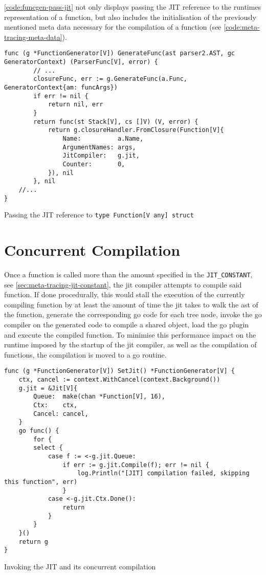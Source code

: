 \autoref{code:funcgen-pass-jit} not only displays passing the JIT reference
to the runtimes representation of a function, but also includes the
initialisation of the previously mentioned meta data necessary for the
compilation of a function (see \autoref{code:meta-tracing-meta-data}).

\begin{listing}[H]
    \begin{verbatim}
func (g *FunctionGenerator[V]) GenerateFunc(ast parser2.AST, gc GeneratorContext) (ParserFunc[V], error) {
        // ...
        closureFunc, err := g.GenerateFunc(a.Func, GeneratorContext{am: funcArgs})
        if err != nil {
            return nil, err
        }
        return func(st Stack[V], cs []V) (V, error) {
            return g.closureHandler.FromClosure(Function[V]{
                Name:          a.Name,
                ArgumentNames: args,
                JitCompiler:   g.jit,
                Counter:       0,
            }), nil
        }, nil
    //...
}
    \end{verbatim}
    \caption{Passing the JIT reference to \texttt{type Function[V any] struct}}
    \label{code:funcgen-pass-jit}
\end{listing}

\section{Concurrent Compilation}
\label{sec:concurrent-compilation}

Once a function is called more than the amount specified in the
\texttt{JIT\_CONSTANT}, see \autoref{sec:meta-tracing-jit-constant}, the jit
compiler attempts to compile said function. If done procedurally, this would
stall the execution of the currently compiling function by at least the amount
of time the jit takes to walk the ast of the function, generate the
corresponding go code for each tree node, invoke the go compiler on the
generated code to compile a shared object, load the go plugin and execute the
compiled function. To minimise this performance impact on the runtime imposed
by the startup of the jit compiler, as well as the compilation of functions,
the compilation is moved to a go routine.

\begin{listing}[H]
    \begin{verbatim}
func (g *FunctionGenerator[V]) SetJit() *FunctionGenerator[V] {
    ctx, cancel := context.WithCancel(context.Background())
    g.jit = &Jit[V]{
        Queue:  make(chan *Function[V], 16),
        Ctx:    ctx,
        Cancel: cancel,
    }
    go func() {
        for {
        select {
            case f := <-g.jit.Queue:
                if err := g.jit.Compile(f); err != nil {
                    log.Println("[JIT] compilation failed, skipping this function", err)
                }
            case <-g.jit.Ctx.Done():
                return
            }
        }
    }()
    return g
}
    \end{verbatim}
    \caption{Invoking the JIT and its concurrent compilation}
    \label{code:invoking-jit}
\end{listing}

